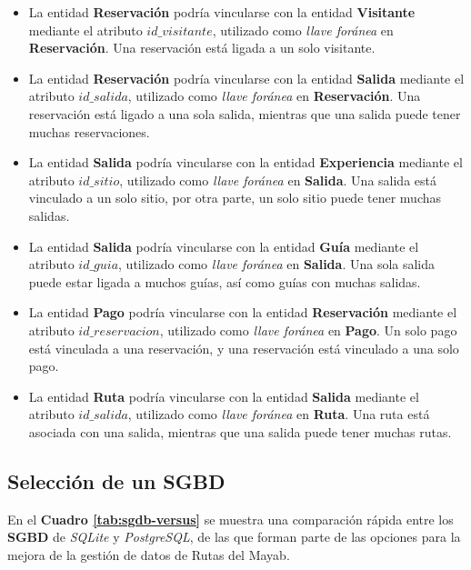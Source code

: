 \documentclass[12pt]{article}
\begin{document}
\begin{itemize}
	\item La entidad \textbf{Reservación} podría vincularse con la entidad \textbf{Visitante} mediante el atributo $id\_visitante$, utilizado como \textit{llave foránea} en \textbf{Reservación}. Una reservación está ligada a un solo visitante.
	\item La entidad \textbf{Reservación} podría vincularse con la entidad \textbf{Salida} mediante el atributo $id\_salida$, utilizado como \textit{llave foránea} en \textbf{Reservación}. Una reservación está ligado a una sola salida, mientras que una salida puede tener muchas reservaciones.
	\item La entidad \textbf{Salida} podría vincularse con la entidad \textbf{Experiencia} mediante el atributo $id\_sitio$, utilizado como \textit{llave foránea} en \textbf{Salida}. Una salida está vinculado a un solo sitio, por otra parte, un solo sitio puede tener muchas salidas.
	\item La entidad \textbf{Salida} podría vincularse con la entidad \textbf{Guía} mediante el atributo $id\_guia$, utilizado como \textit{llave foránea} en \textbf{Salida}. Una sola salida puede estar ligada a muchos guías, así como guías con muchas salidas.
	\item La entidad \textbf{Pago} podría vincularse con la entidad \textbf{Reservación} mediante el atributo $id\_reservacion$, utilizado como \textit{llave foránea} en \textbf{Pago}. Un solo pago está vinculada a una reservación, y una reservación está vinculado a una solo pago.
	\item La entidad \textbf{Ruta} podría vincularse con la entidad \textbf{Salida} mediante el atributo $id\_salida$, utilizado como \textit{llave foránea} en \textbf{Ruta}. Una ruta está asociada con una salida, mientras que una salida puede tener muchas rutas.
\end{itemize}

\subsection*{Selección de un SGBD}

En el \textbf{Cuadro \ref{tab:sgdb-versus}} se muestra una comparación rápida entre los \textbf{SGBD} de \textit{SQLite} y \textit{PostgreSQL}, de las que forman parte de las opciones para la mejora de la gestión de datos de Rutas del Mayab.
\end{document}
